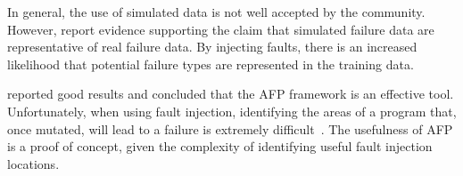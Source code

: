 In general, the use of simulated data is not well accepted by the community.
However, \citet{irrera2010,irrera2014} report evidence supporting the claim
that simulated failure data are representative of real failure data.  By
injecting faults, there is an increased likelihood that potential failure types
are represented in the training data.

\citet{irrera2015} reported good results and concluded that the \ac{AFP}
framework is an effective tool.  Unfortunately, when using fault injection,
identifying the areas of a program that, once mutated, will lead to a failure
is extremely difficult~\citep{irrera2010,kikuchi2014,natella2016assessing}.
The usefulness of \ac{AFP} is a proof of concept, given the complexity of
identifying useful fault injection locations.
